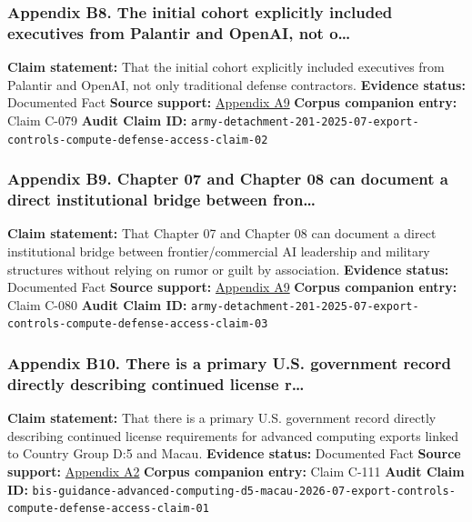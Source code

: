 \documentclass[
  american,
  11pt,
  letterpaper,
]{article}
\begin{document}
\subsubsection{Appendix B8. The initial cohort explicitly included
executives from Palantir and OpenAI, not
o\ldots{}}\label{appendix-b8-the-initial-cohort-explicitly-included-executives-from-palantir-and-openai-not-o}

\textbf{Claim statement:} That the initial cohort explicitly included
executives from Palantir and OpenAI, not only traditional defense
contractors. \textbf{Evidence status:} Documented Fact \textbf{Source
support:}
\hyperref[appendix-a9-army-launches-detachment-201-executive-innovation-corps-to-drive-tech-transformation]{Appendix
A9} \textbf{Corpus companion entry:} Claim C-079 \textbf{Audit Claim
ID:}
\texttt{army-detachment-201-2025-07-export-controls-compute-defense-access-claim-02}

\subsubsection{Appendix B9. Chapter 07 and Chapter 08 can document a
direct institutional bridge between
fron\ldots{}}\label{appendix-b9-chapter-07-and-chapter-08-can-document-a-direct-institutional-bridge-between-fron}

\textbf{Claim statement:} That Chapter 07 and Chapter 08 can document a
direct institutional bridge between frontier/commercial AI leadership
and military structures without relying on rumor or guilt by
association. \textbf{Evidence status:} Documented Fact \textbf{Source
support:}
\hyperref[appendix-a9-army-launches-detachment-201-executive-innovation-corps-to-drive-tech-transformation]{Appendix
A9} \textbf{Corpus companion entry:} Claim C-080 \textbf{Audit Claim
ID:}
\texttt{army-detachment-201-2025-07-export-controls-compute-defense-access-claim-03}

\subsubsection{Appendix B10. There is a primary U.S. government record
directly describing continued license
r\ldots{}}\label{appendix-b10-there-is-a-primary-u-s-government-record-directly-describing-continued-license-r}

\textbf{Claim statement:} That there is a primary U.S. government record
directly describing continued license requirements for advanced
computing exports linked to Country Group D:5 and Macau.
\textbf{Evidence status:} Documented Fact \textbf{Source support:}
\hyperref[appendix-a2-guidance-regarding-enforcement-of-license-requirements-for-advanced-computing-items-for-entities-headquartered-in-country-group-d-5-and-macau]{Appendix
A2} \textbf{Corpus companion entry:} Claim C-111 \textbf{Audit Claim
ID:}
\texttt{bis-guidance-advanced-computing-d5-macau-2026-07-export-controls-compute-defense-access-claim-01}
\end{document}
